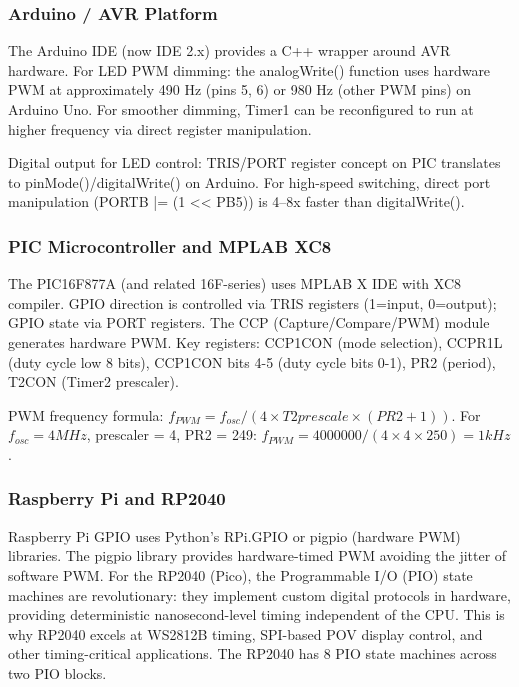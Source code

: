 \documentclass[11pt,letterpaper]{article}
\begin{document}
\subsubsection{Arduino / AVR Platform}

The Arduino IDE (now IDE 2.x) provides a C++ wrapper around AVR hardware. For LED PWM dimming: the analogWrite() function uses hardware PWM at approximately 490 Hz (pins 5, 6) or 980 Hz (other PWM pins) on Arduino Uno. For smoother dimming, Timer1 can be reconfigured to run at higher frequency via direct register manipulation.

Digital output for LED control: TRIS/PORT register concept on PIC translates to pinMode()/digitalWrite() on Arduino. For high-speed switching, direct port manipulation (PORTB |= (1 << PB5)) is 4--8x faster than digitalWrite().

\subsubsection{PIC Microcontroller and MPLAB XC8}

The PIC16F877A (and related 16F-series) uses MPLAB X IDE with XC8 compiler. GPIO direction is controlled via TRIS registers (1=input, 0=output); GPIO state via PORT registers. The CCP (Capture/Compare/PWM) module generates hardware PWM. Key registers: CCP1CON (mode selection), CCPR1L (duty cycle low 8 bits), CCP1CON bits 4-5 (duty cycle bits 0-1), PR2 (period), T2CON (Timer2 prescaler).

PWM frequency formula: $f_{PWM} = f_{osc} / (4 \times T2prescale \times (PR2 + 1))$. For $f_{osc} = 4MHz$, prescaler = 4, PR2 = 249: $f_{PWM} = 4000000 / (4 \times 4 \times 250) = 1 kHz$.

\subsubsection{Raspberry Pi and RP2040}

Raspberry Pi GPIO uses Python's RPi.GPIO or pigpio (hardware PWM) libraries. The pigpio library provides hardware-timed PWM avoiding the jitter of software PWM. For the RP2040 (Pico), the Programmable I/O (PIO) state machines are revolutionary: they implement custom digital protocols in hardware, providing deterministic nanosecond-level timing independent of the CPU. This is why RP2040 excels at WS2812B timing, SPI-based POV display control, and other timing-critical applications. The RP2040 has 8 PIO state machines across two PIO blocks.
\end{document}
